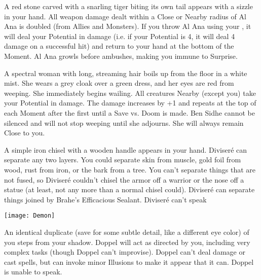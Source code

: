


A red stone carved with a snarling tiger biting its own tail appears with a sizzle in your hand.  All weapon damage dealt within a Close or Nearby radius of Al Ana is doubled (from Allies and Monsters).  If you throw Al Ana using your \DEX, it will deal your Potential in damage (i.e. if your Potential is 4, it will deal 4 damage on a successful hit) and return to your hand at the bottom of the Moment.  Al Ana growls before ambushes, making you immune to Surprise.


A spectral woman with long, streaming hair boils up from the floor in a white mist.  She wears a grey cloak over a green dress, and her eyes are red from weeping.  She immediately begins wailing.  All creatures Nearby (except you) take your Potential in damage.  The damage increases by +1 and repeats at the top of each Moment after the first until a Save vs. Doom is made.  Ben Sidhe cannot be silenced and will not stop weeping until she adjourns.  She will always remain Close to you.


A simple iron chisel with a wooden handle appears in your hand.  Diviseré can separate any two layers.  You could separate skin from muscle, gold foil from wood, rust from iron, or the bark from a tree. You can't separate things that are not fused, so Diviseré couldn't chisel the armor off a warrior or the nose off a statue (at least, not any more than a normal chisel could). Diviseré can separate things joined by Brahe's Efficacious Sealant.  Diviseré can't speak


  \texttt{[image: Demon]}


An identical duplicate (save for some subtle detail, like a different eye color) of you steps from your shadow.  Doppel will act as directed by you, including very complex tasks (though Doppel can't improvise).  Doppel can't deal damage or cast spells, but can invoke minor Illusions to make it appear that it can.  Doppel is unable to speak.


